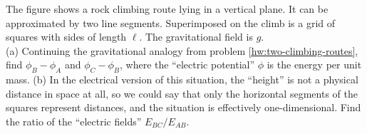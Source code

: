 The figure shows a rock climbing route lying in a vertical plane.
It can be approximated by two line segments. Superimposed on the climb
is a grid of squares with sides of length $\ell$. The gravitational field
is $g$.\\
(a) Continuing the gravitational
analogy from problem \ref{hw:two-climbing-routes}, find
$\phi_B-\phi_A$ and $\phi_C-\phi_B$, where the ``electric potential''
$\phi$ is the energy per unit mass.\answercheck\hwendpart
(b) In the electrical version of this situation, the ``height'' is
not a physical distance in space at all, so we could say that
only the horizontal segments of the squares represent
distances, and the situation is effectively one-dimensional.
Find the ratio of the ``electric fields'' $E_{BC}/E_{AB}$.\answercheck
